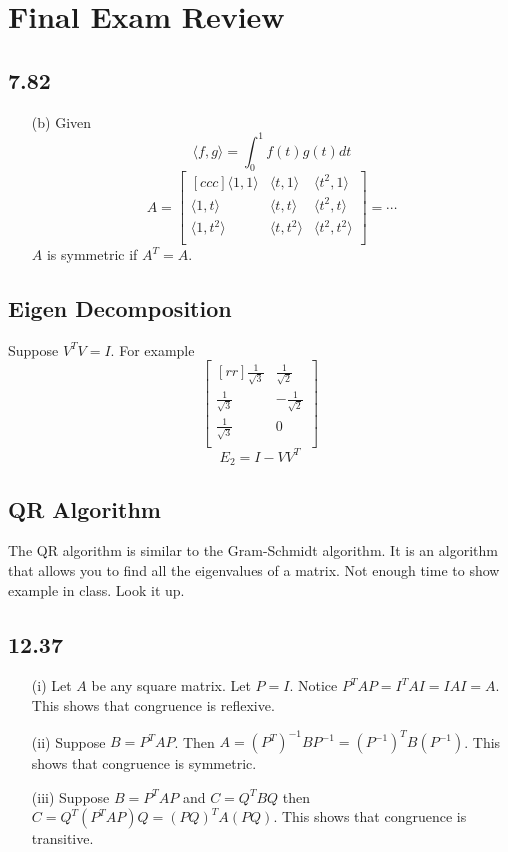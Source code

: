 \documentclass{report}
\begin{document}
\section{Final Exam Review}
\subsection{7.82}
\begin{enumerate}
\item[(b)]Given
\[ \langle f,g \rangle = \int_{0}^1 f(t)g(t)dt \]
\[ A=\begin{bmatrix}[ccc]\langle 1,1 \rangle & \langle t,1 \rangle & \langle t^2,1 \rangle\\\langle 1,t \rangle & \langle t,t \rangle & \langle t^2,t \rangle\\\langle 1,t^2 \rangle & \langle t,t^2 \rangle & \langle t^2,t^2\rangle\\\end{bmatrix} = \cdots \]
$A$ is symmetric if $A^T=A$.
\end{enumerate}

\subsection{Eigen Decomposition}
Suppose $V^TV = I$. For example
\[ \begin{bmatrix}[rr]\frac{1}{\sqrt{3}} & \frac{1}{\sqrt{2}}\\\frac{1}{\sqrt{3}}&-\frac{1}{\sqrt{2}}\\\frac{1}{\sqrt{3}}&0\\\end{bmatrix} \]
\[ E_2 = I- VV^T \]

\subsection{QR Algorithm}
The QR algorithm is similar to the Gram-Schmidt algorithm. It is an algorithm that allows you to find all the eigenvalues of a matrix. Not enough time to show example in class. Look it up.

\subsection{12.37}
\begin{enumerate}
\item[(i)]Let $A$ be any square matrix. Let $P=I$. Notice $P^TAP=I^TAI=IAI=A$. This shows that congruence is reflexive.
\item[(ii)]Suppose $B=P^TAP$. Then $A=(P^T)^{-1}BP^{-1} = (P^{-1})^TB(P^{-1})$. This shows that congruence is symmetric.
\item[(iii)]Suppose $B=P^TAP$ and $C=Q^TBQ$ then $C=Q^T(P^TAP)Q=(PQ)^TA(PQ)$. This shows that congruence is transitive.
\end{enumerate}
\end{document}
